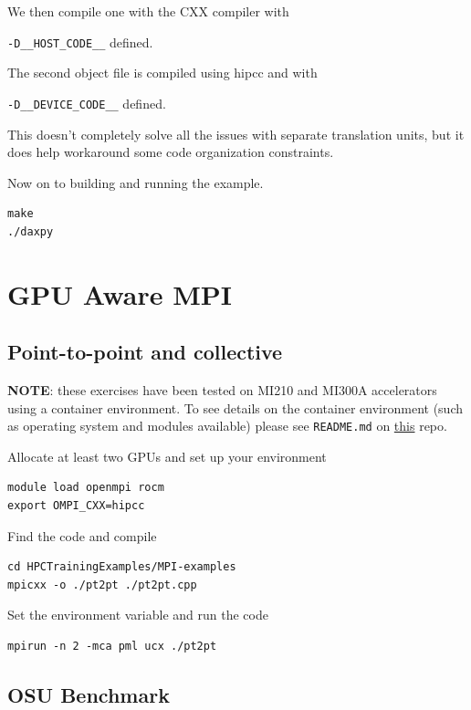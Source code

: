 \documentclass[
]{article}
\let\oldtexttt\texttt
\renewcommand{\texttt}[1]{
  \colorbox{Light}{\oldtexttt{#1}}
}
\begin{document}
We then compile one with the CXX compiler with
\texttt{-D\_\_HOST\_CODE\_\_} defined.

The second object file is compiled using hipcc and with
\texttt{-D\_\_DEVICE\_CODE\_\_} defined.

This doesn't completely solve all the issues with separate translation
units, but it does help workaround some code organization constraints.

Now on to building and running the example.

\begin{verbatim}
make
./daxpy
\end{verbatim}

\pagebreak

\hypertarget{gpu-aware-mpi}{%
\section{GPU Aware MPI}\label{gpu-aware-mpi}}

\hypertarget{point-to-point-and-collective}{%
\subsection{Point-to-point and
collective}\label{point-to-point-and-collective}}

\textbf{NOTE}: these exercises have been tested on MI210 and MI300A
accelerators using a container environment. To see details on the
container environment (such as operating system and modules available)
please see \texttt{README.md} on
\href{https://github.com/amd/HPCTrainingDock}{this} repo.

Allocate at least two GPUs and set up your environment

\begin{verbatim}
module load openmpi rocm
export OMPI_CXX=hipcc
\end{verbatim}

Find the code and compile

\begin{verbatim}
cd HPCTrainingExamples/MPI-examples
mpicxx -o ./pt2pt ./pt2pt.cpp
\end{verbatim}

Set the environment variable and run the code

\begin{verbatim}
mpirun -n 2 -mca pml ucx ./pt2pt
\end{verbatim}

\hypertarget{osu-benchmark}{%
\subsection{OSU Benchmark}\label{osu-benchmark}}
\end{document}
